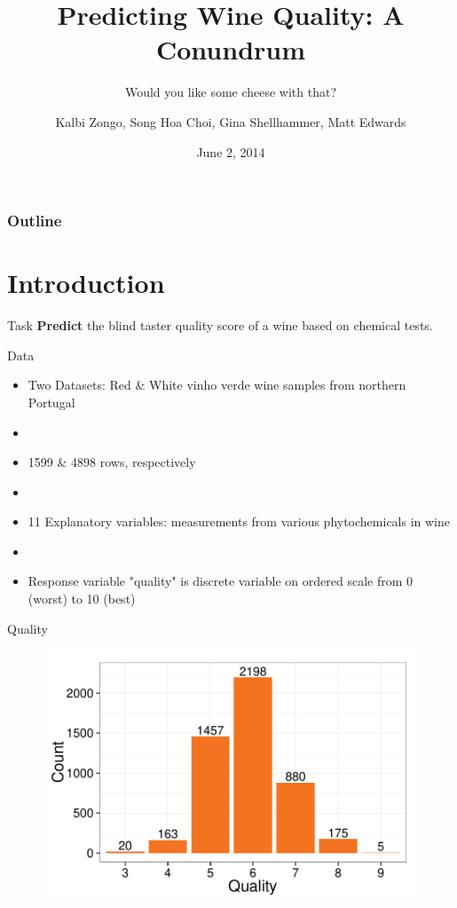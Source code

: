 \documentclass{beamer}
\title{Predicting Wine Quality: A Conundrum}
\subtitle{Would you like some cheese with that?}
\author{Kalbi Zongo, Song Hoa Choi, Gina Shellhammer, Matt Edwards}
\date{June 2, 2014}
\begin{document}
\begin{frame}
\titlepage
\end{frame}

\begin{frame}
\frametitle{Outline}
\tableofcontents
\end{frame}

\section{Introduction}
\begin{frame}{Task}
\textbf{Predict} the blind taster quality score of a wine based on chemical tests.

\end{frame}

\begin{frame}{Data}
\begin{itemize}
	\item Two Datasets: Red \& White vinho verde wine samples from northern Portugal
	\item[]
	\item 1599 \& 4898 rows, respectively
	\item[]
	\item 11 Explanatory variables: measurements from various phytochemicals in wine
	\item[]
	\item Response variable "quality" is discrete variable on ordered scale from 0 (worst) to 10 (best)
\end{itemize}
\end{frame}

\begin{frame}{Quality}
\begin{figure}
	\centering
	\includegraphics[width=\textwidth]{../images/white_hist.pdf}
\end{figure}
\end{frame}
\end{document}
